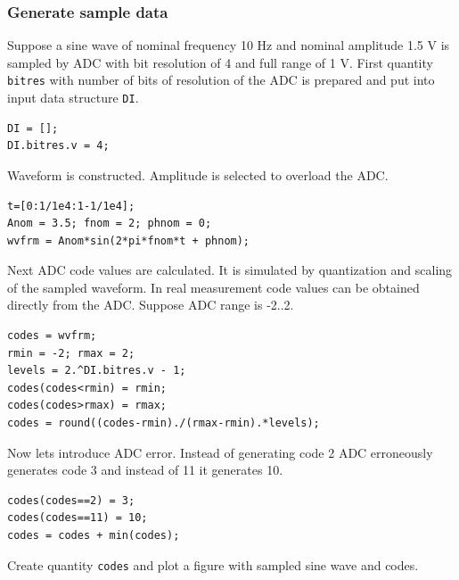 \startcontents[localtoc]



{}
\subsubsection*{Generate sample data}



Suppose a sine wave of nominal frequency 10 Hz and nominal amplitude 1.5 V is sampled by ADC with
bit resolution of 4 and full range of 1 V. First quantity \texttt{bitres} with number of bits of
resolution of the ADC is prepared and put into input data structure \texttt{DI}.

\begin{lstlisting}
DI = [];
DI.bitres.v = 4;
\end{lstlisting}


Waveform is constructed. Amplitude is selected to overload the ADC.

\begin{lstlisting}
t=[0:1/1e4:1-1/1e4];
Anom = 3.5; fnom = 2; phnom = 0;
wvfrm = Anom*sin(2*pi*fnom*t + phnom);
\end{lstlisting}


Next ADC code values are calculated. It is simulated by quantization and scaling of the sampled
waveform. In real measurement code values can be obtained directly from the ADC. Suppose ADC range
is -2..2.

\begin{lstlisting}
codes = wvfrm;
rmin = -2; rmax = 2;
levels = 2.^DI.bitres.v - 1;
codes(codes<rmin) = rmin;
codes(codes>rmax) = rmax;
codes = round((codes-rmin)./(rmax-rmin).*levels);
\end{lstlisting}


Now lets introduce ADC error. Instead of generating code 2 ADC erroneously generates
code 3 and instead of 11 it generates 10.

\begin{lstlisting}
codes(codes==2) = 3;
codes(codes==11) = 10;
codes = codes + min(codes);
\end{lstlisting}


Create quantity \texttt{codes} and plot a figure with sampled sine wave and codes.

